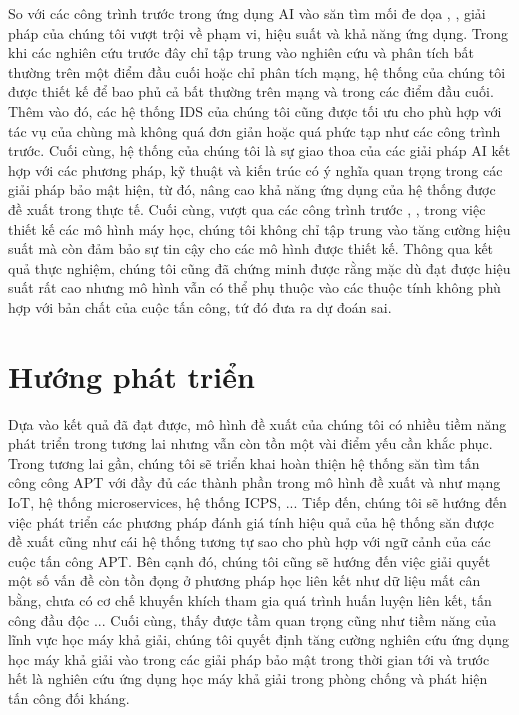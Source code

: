 So với các công trình trước trong ứng dụng AI vào săn tìm mối đe dọa \cite{abdel2021federated}, \cite{chen2022building}, giải pháp của chúng tôi vượt trội về phạm vi, hiệu suất và khả năng ứng dụng. Trong khi các nghiên cứu trước đây chỉ tập trung vào nghiên cứu và phân tích bất thường trên một điểm đầu cuối hoặc chỉ phân tích mạng, hệ thống của chúng tôi được thiết kế để bao phủ cả bất thường trên mạng và trong các điểm đầu cuối. Thêm vào đó, các hệ thống IDS của chúng tôi cũng được tối ưu cho phù hợp với tác vụ của chùng mà không quá đơn giản hoặc quá phức tạp như các công trình trước. Cuối cùng, hệ thống của chúng tôi là sự giao thoa của các giải pháp AI kết hợp với các phương pháp, kỹ thuật và kiến trúc có ý nghĩa quan trọng trong các giải pháp bảo mật hiện, từ đó, nâng cao khả năng ứng dụng của hệ thống được đề xuất trong thực tế. Cuối cùng, vượt qua các công trình trước \cite{abdel2021federated}, \cite{lo2022graphsage}, \cite{yazdinejadna2021kangaroo} trong việc thiết kế các mô hình máy học, chúng tôi không chỉ tập trung vào tăng cường hiệu suất mà còn đảm bảo sự tin cậy cho các mô hình được thiết kế. Thông qua kết quả thực nghiệm, chúng tôi cũng đã chứng minh được rằng mặc dù đạt được hiệu suất rất cao nhưng mô hình vẫn có thể phụ thuộc vào các thuộc tính không phù hợp với bản chất của cuộc tấn công, tứ đó đưa ra dự đoán sai.
\section{Hướng phát triển}

Dựa vào kết quả đã đạt được, mô hình đề xuất của chúng tôi có nhiều tiềm năng phát triển trong tương lai nhưng vẫn còn tồn một vài điểm yếu cần khắc phục. Trong tương lai gần, chúng tôi sẽ triển khai hoàn thiện hệ thống săn tìm tấn công công APT với đầy đủ các thành phần trong mô hình đề xuất và như mạng IoT, hệ thống microservices, hệ thống ICPS, ... Tiếp đến, chúng tôi sẽ hướng đến việc phát triển các phương pháp đánh giá tính hiệu quả của hệ thống săn được đề xuất cũng như cái hệ thống tương tự sao cho phù hợp với ngữ cảnh của các cuộc tấn công APT. 
\bigbreak\noindent 
Bên cạnh đó, chúng tôi cũng sẽ hướng đến việc giải quyết một số vấn đề còn tồn đọng ở phương pháp học liên kết như dữ liệu mất cân bằng, chưa có cơ chế khuyến khích tham gia quá trình huấn luyện liên kết, tấn công đầu độc ... Cuối cùng, thấy được tầm quan trọng cũng như tiềm năng của lĩnh vực học máy khả giải, chúng tôi quyết định tăng cường nghiên cứu ứng dụng học máy khả giải vào trong các giải pháp bảo mật trong thời gian tới và trước hết là nghiên cứu ứng dụng học máy khả giải trong phòng chống và phát hiện tấn công đối kháng.

